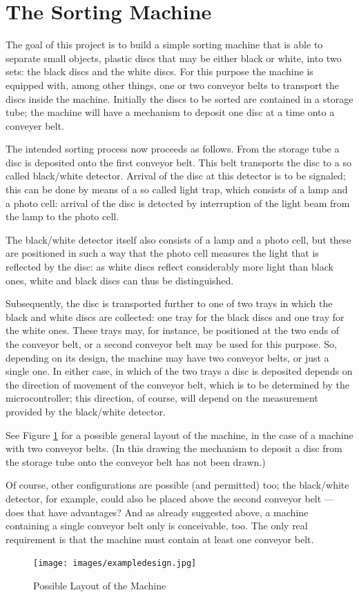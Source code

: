 \documentclass[a4paper,oneside,11pt]{report}
\begin{document}
\section{The Sorting Machine}
The goal of this project is to build a simple sorting machine that is able to separate small objects, plastic discs that may be either black or white, into two sets: the black discs and the white discs. For this purpose the machine is equipped with, among other things, one or two conveyor belts to transport the discs inside the machine. Initially the discs to be sorted are contained in a storage tube; the machine will have a mechanism to deposit one disc at a time onto a conveyer belt.

The intended sorting process now proceeds as follows. From the storage tube a disc is deposited onto the first conveyor belt. This belt transports the disc to a so called black/white detector. Arrival of the disc at this detector is to be signaled; this can be done by means of a so called light trap, which consists of a lamp and a photo cell: arrival of the disc is detected by interruption of the light beam from the lamp to the photo cell.

The black/white detector itself also consists of a lamp and a photo cell, but these are positioned in such a way that the photo cell measures the light that is reflected by the disc: as white discs reflect considerably more light than black ones, white and black discs can thus be distinguished.

Subsequently, the disc is transported further to one of two trays in which the black and white discs are collected: one tray for the black discs and one tray for the white ones. These trays may, for instance, be positioned at the two ends of the conveyor belt, or a second conveyor belt may be used for this purpose. So, depending on its design, the machine may have two conveyor belts, or just a single one. In either case, in which of the two trays a disc is deposited depends on the direction of movement of the conveyor belt, which is to be determined by the microcontroller; this direction, of course, will depend on the measurement provided by the black/white detector.

See Figure \ref{fig:exampledesign} for a possible general layout of the machine, in the case of a machine with two conveyor belts. (In this drawing the mechanism to deposit a disc from the storage tube onto the conveyor belt has not been drawn.)

Of course, other configurations are possible (and permitted) too; the black/white detector, for example, could also be placed above the second conveyor belt --- does that have advantages? And as already suggested above, a machine containing a single conveyor belt only is conceivable, too. The only real requirement is that the machine must contain at least one conveyor belt.
\begin{figure}[H]
\centering
\texttt{[image: images/exampledesign.jpg]}
\caption{Possible Layout of the Machine}
\label{fig:exampledesign}
\end{figure}
\end{document}
